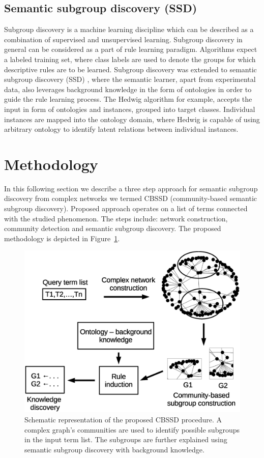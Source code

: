 \documentclass[oribibl,runningheads,a4paper]{llncs}
\begin{document}
\subsection{Semantic subgroup discovery (SSD)}

Subgroup discovery is a machine learning discipline which can be described as a combination of supervised and unsupervised learning. Subgroup discovery in general can be considered as a part of rule learning paradigm. Algorithms expect a labeled training set, where class labels are used to denote the groups for which descriptive rules are to be learned. Subgroup discovery was extended to semantic subgroup discovery (SSD) \cite{vavpetivc2013semantic,trajkovski2006relational,langohr2012contrasting}, where the semantic learner, apart from experimental data, also leverages background knowledge in the form of ontologies in order to guide the rule learning process. The Hedwig algorithm \cite{adhikari2016explaining, vavpetivc2013semantic} for example, accepts the input in form of ontologies and instances, grouped into target classes. Individual instances are mapped into the ontology domain, where Hedwig is capable of using arbitrary ontology to identify latent relations between individual instances.


\section{Methodology}

In this following section we describe a three step approach for semantic subgroup discovery from complex networks we termed CBSSD (community-based semantic subgroup discovery). Proposed approach operates on a list of terms connected with the studied phenomenon. The steps include: network construction, community detection and semantic subgroup discovery. The proposed methodology is depicted in Figure~\ref{fig:example}. 

\begin{figure}[!h]
\centering
\includegraphics[scale=0.35]{workflow2}
\caption{Schematic representation of the proposed CBSSD procedure. A complex graph's communities are used to identify possible subgroups in the input term list. The subgroups are further explained using semantic subgroup discovery with background knowledge.}
\label{fig:example}
\end{figure}
\end{document}
